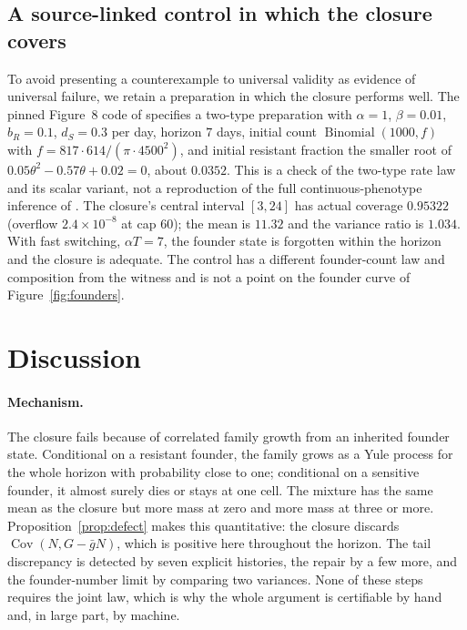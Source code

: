\documentclass[11pt,a4paper]{article}
\theoremstyle{plain}
\theoremstyle{definition}
\theoremstyle{remark}
\newcommand{\Cov}{\operatorname{Cov}}
\begin{document}
\subsection{A source-linked control in which the closure covers}\label{sec:control}
To avoid presenting a counterexample to universal validity as evidence of universal failure, we retain a preparation in which the closure performs well. The pinned Figure~8 code of \citet{browningcode} specifies a two-type preparation with $\alpha=1$, $\beta=0.01$, $b_R=0.1$, $d_S=0.3$ per day, horizon $7$ days, initial count $\operatorname{Binomial}(1000,f)$ with $f=817\cdot614/(\pi\cdot4500^2)$, and initial resistant fraction the smaller root of $0.05\theta^2-0.57\theta+0.02=0$, about $0.0352$. This is a check of the two-type rate law and its scalar variant, not a reproduction of the full continuous-phenotype inference of \citet{browning2025}. The closure's central interval $[3,24]$ has actual coverage $0.95322$ (overflow $2.4\times10^{-8}$ at cap $60$); the mean is $11.32$ and the variance ratio is $1.034$. With fast switching, $\alpha T=7$, the founder state is forgotten within the horizon and the closure is adequate. The control has a different founder-count law and composition from the witness and is not a point on the founder curve of Figure~\ref{fig:founders}.

\section{Discussion}\label{sec:discussion}

\paragraph{Mechanism.} The closure fails because of correlated family growth from an inherited founder state. Conditional on a resistant founder, the family grows as a Yule process for the whole horizon with probability close to one; conditional on a sensitive founder, it almost surely dies or stays at one cell. The mixture has the same mean as the closure but more mass at zero and more mass at three or more. Proposition~\ref{prop:defect} makes this quantitative: the closure discards $\Cov(N,G-\bar gN)$, which is positive here throughout the horizon. The tail discrepancy is detected by seven explicit histories, the repair by a few more, and the founder-number limit by comparing two variances. None of these steps requires the joint law, which is why the whole argument is certifiable by hand and, in large part, by machine.
\end{document}
